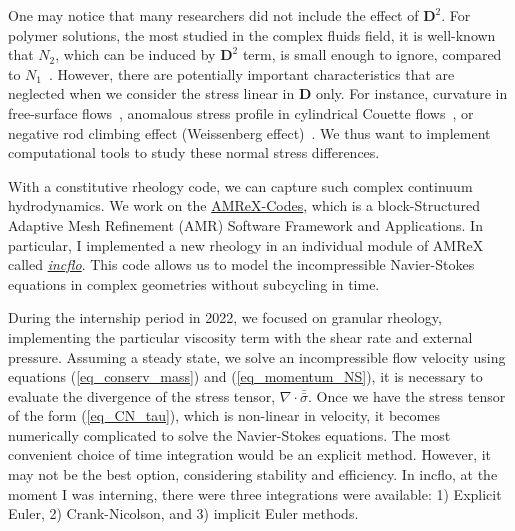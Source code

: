 One may notice that many researchers did not include the effect of $\bm{D}^2$. For polymer solutions, the most studied in the complex fluids field, it is well-known that $N_2$, which can be induced by $\bm{D}^2$ term, is small enough to ignore, compared to $N_1$~\cite{bird_dynamics_1987}. However, there are potentially important characteristics that are neglected when we consider the stress linear in $\boldsymbol{D}$ only. For instance, curvature in free-surface flows~\cite{couturier_suspensions_2011}, anomalous stress profile in cylindrical Couette flows~\cite{krishnaraj_dilation-driven_2016}, or negative rod climbing effect (Weissenberg effect)~\cite{boyer_dense_2011}. We thus want to implement computational tools to study these normal stress differences. 
\par
With a constitutive rheology code, we can capture such complex continuum hydrodynamics. 
We work on the \href{https://amrex-codes.github.io/index.html}{{\color{blue}AMReX-Codes}}, which is a block-Structured Adaptive Mesh Refinement (AMR) Software Framework and Applications. In particular, I implemented a new rheology in an individual module of AMReX called \href{https://amrex-codes.github.io/incflo/}{{\color{blue}\textit{incflo}}}. This code allows us to model the incompressible Navier-Stokes equations in complex geometries without subcycling in time.
\par
During the internship period in 2022, we focused on granular rheology, implementing the particular viscosity term with the shear rate and external pressure. Assuming a steady state, we solve an incompressible flow velocity using equations (\ref{eq_conserv_mass}) and (\ref{eq_momentum_NS}), it is necessary to evaluate the divergence of the stress tensor, $\nabla \cdot \bar{\bar{\sigma}}$. Once we have the stress tensor of the form (\ref{eq_CN_tau}), which is non-linear in velocity, it becomes numerically complicated to solve the Navier-Stokes equations. The most convenient choice of time integration would be an explicit method. However, it may not be the best option, considering stability and efficiency. In incflo, at the moment I was interning, there were three integrations were available: 1) Explicit Euler, 2) Crank-Nicolson, and 3) implicit Euler methods. 






